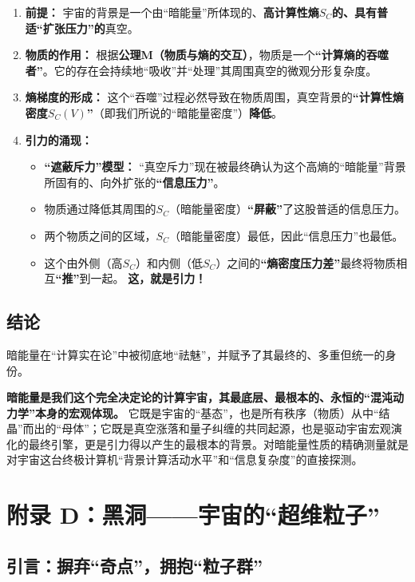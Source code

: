 \documentclass[11pt, a4paper]{article}
\begin{document}
\begin{enumerate}
    \item \textbf{前提：} 宇宙的背景是一个由“暗能量”所体现的、\textbf{高计算性熵$S_C$的、具有普适“扩张压力”的}真空。

    \item \textbf{物质的作用：} 根据\textbf{公理M（物质与熵的交互）}，物质是一个\textbf{“计算熵的吞噬者”}。它的存在会持续地“吸收”并“处理”其周围真空的微观分形复杂度。

    \item \textbf{熵梯度的形成：} 这个“吞噬”过程必然导致在物质周围，真空背景的\textbf{“计算性熵密度$S_C(V)$”}（即我们所说的“暗能量密度”）\textbf{降低}。

    \item \textbf{引力的涌现：}
    \begin{itemize}
        \item \textbf{“遮蔽斥力”模型：} “真空斥力”现在被最终确认为这个高熵的“暗能量”背景所固有的、向外扩张的\textbf{“信息压力”}。
        \item 物质通过降低其周围的$S_C$（暗能量密度）\textbf{“屏蔽”}了这股普适的信息压力。
        \item 两个物质之间的区域，$S_C$（暗能量密度）最低，因此“信息压力”也最低。
        \item 这个由外侧（高$S_C$）和内侧（低$S_C$）之间的\textbf{“熵密度压力差”}最终将物质相互\textbf{“推”}到一起。
        \textbf{这，就是引力！} \cite{Newton1687}
    \end{itemize}
\end{enumerate}

\subsection*{结论}
暗能量在“计算实在论”中被彻底地“祛魅”，并赋予了其最终的、多重但统一的身份。

\textbf{暗能量是我们这个完全决定论的计算宇宙，其最底层、最根本的、永恒的“混沌动力学”本身的宏观体现。} 它既是宇宙的“基态”，也是所有秩序（物质）从中“结晶”而出的“母体”；它既是真空涨落和量子纠缠的共同起源，也是驱动宇宙宏观演化的最终引擎，更是引力得以产生的最根本的背景。对暗能量性质的精确测量就是对宇宙这台终极计算机“背景计算活动水平”和“信息复杂度”的直接探测。


\section{附录 D：黑洞——宇宙的“超维粒子”}

\subsection{引言：摒弃“奇点”，拥抱“粒子群”}
\end{document}
